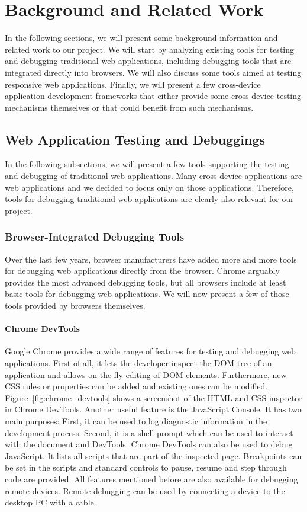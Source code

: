 \chapter{Background and Related Work}

In the following sections, we will present some background information and related work to our project. We will start by analyzing existing tools for testing and debugging traditional web applications, including debugging tools that are integrated directly into browsers. We will also discuss some tools aimed at testing responsive web applications. Finally, we will present a few cross-device application development frameworks that either provide some cross-device testing mechanisms themselves or that could benefit from such mechanisms.

\section{Web Application Testing and Debuggings}

In the following subsections, we will present a few tools supporting the testing and debugging of traditional web applications. Many cross-device applications are web applications and we decided to focus only on those applications. Therefore, tools for debugging traditional web applications are clearly also relevant for our project.

\subsection{Browser-Integrated Debugging Tools}

Over the last few years, browser manufacturers have added more and more tools for debugging web applications directly from the browser. Chrome arguably provides the most advanced debugging tools, but all browsers include at least basic tools for debugging web applications. We will now present a few of those tools provided by browsers themselves.

\subsubsection{Chrome DevTools}

Google Chrome provides a wide range of features for testing and debugging web applications. First of all, it lets the developer inspect the DOM tree of an application and allows on-the-fly editing of DOM elements. Furthermore, new CSS rules or properties can be added and existing ones can be modified. Figure~\ref{fig:chrome_devtools} shows a screenshot of the HTML and CSS inspector in Chrome DevTools. Another useful feature is the JavaScript Console. It has two main purposes: First, it can be used to log diagnostic information in the development process. Second, it is a shell prompt which can be used to interact with the document and DevTools. Chrome DevTools can also be used to debug JavaScript. It lists all scripts that are part of the inspected page. Breakpoints can be set in the scripts and standard controls to pause, resume and step through code are provided. All features mentioned before are also available for debugging remote devices. Remote debugging can be used by connecting a device to the desktop PC with a cable.

